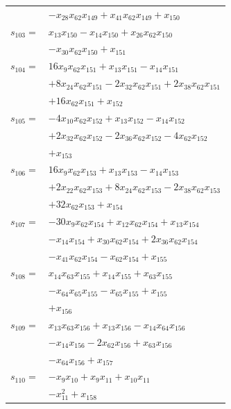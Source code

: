 \begin{longtable}{@{}r@{\;}l@{}}
 & \(\displaystyle -x_{28}x_{62}x_{149} +x_{41}x_{62}x_{149} +x_{150}\) \\[3pt]
\(s_{103}=\) & \(\displaystyle x_{13}x_{150} -x_{14}x_{150} +x_{26}x_{62}x_{150}\) \\
 & \(\displaystyle -x_{30}x_{62}x_{150} +x_{151}\) \\[3pt]
\(s_{104}=\) & \(\displaystyle 16x_{9}x_{62}x_{151} +x_{13}x_{151} -x_{14}x_{151}\) \\
 & \(\displaystyle +8x_{24}x_{62}x_{151} -2x_{32}x_{62}x_{151} +2x_{38}x_{62}x_{151}\) \\
 & \(\displaystyle +16x_{62}x_{151} +x_{152}\) \\[3pt]
\(s_{105}=\) & \(\displaystyle -4x_{10}x_{62}x_{152} +x_{13}x_{152} -x_{14}x_{152}\) \\
 & \(\displaystyle +2x_{32}x_{62}x_{152} -2x_{36}x_{62}x_{152} -4x_{62}x_{152}\) \\
 & \(\displaystyle +x_{153}\) \\[3pt]
\(s_{106}=\) & \(\displaystyle 16x_{9}x_{62}x_{153} +x_{13}x_{153} -x_{14}x_{153}\) \\
 & \(\displaystyle +2x_{22}x_{62}x_{153} +8x_{24}x_{62}x_{153} -2x_{38}x_{62}x_{153}\) \\
 & \(\displaystyle +32x_{62}x_{153} +x_{154}\) \\[3pt]
\(s_{107}=\) & \(\displaystyle -30x_{9}x_{62}x_{154} +x_{12}x_{62}x_{154} +x_{13}x_{154}\) \\
 & \(\displaystyle -x_{14}x_{154} +x_{30}x_{62}x_{154} +2x_{36}x_{62}x_{154}\) \\
 & \(\displaystyle -x_{41}x_{62}x_{154} -x_{62}x_{154} +x_{155}\) \\[3pt]
\(s_{108}=\) & \(\displaystyle x_{14}x_{63}x_{155} +x_{14}x_{155} +x_{63}x_{155}\) \\
 & \(\displaystyle -x_{64}x_{65}x_{155} -x_{65}x_{155} +x_{155}\) \\
 & \(\displaystyle +x_{156}\) \\[3pt]
\(s_{109}=\) & \(\displaystyle x_{13}x_{63}x_{156} +x_{13}x_{156} -x_{14}x_{64}x_{156}\) \\
 & \(\displaystyle -x_{14}x_{156} -2x_{62}x_{156} +x_{63}x_{156}\) \\
 & \(\displaystyle -x_{64}x_{156} +x_{157}\) \\[3pt]
\(s_{110}=\) & \(\displaystyle -x_{9}x_{10} +x_{9}x_{11} +x_{10}x_{11}\) \\
 & \(\displaystyle -x_{11}^{2} +x_{158}\) \\[3pt]

\end{longtable}
